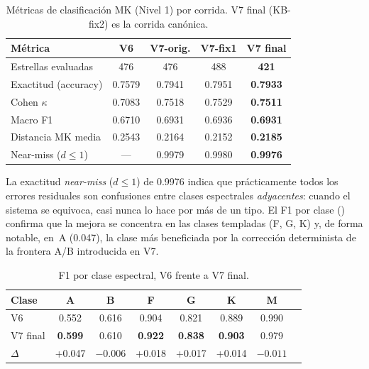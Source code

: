 \begin{table}[H]
  \centering
  \caption{Métricas de clasificación MK (Nivel 1) por corrida. V7 final
  (KB-fix2) es la corrida canónica.}
  \label{tab:l1-global}
  \begin{tabular}{lcccc}
    \toprule
    Métrica & V6 & V7-orig. & V7-fix1 & \textbf{V7 final} \\
    \midrule
    Estrellas evaluadas   & 476    & 476    & 488    & \textbf{421} \\
    Exactitud (accuracy)  & 0.7579 & 0.7941 & 0.7951 & \textbf{0.7933} \\
    Cohen $\kappa$        & 0.7083 & 0.7518 & 0.7529 & \textbf{0.7511} \\
    Macro F1              & 0.6710 & 0.6931 & 0.6936 & \textbf{0.6931} \\
    Distancia MK media    & 0.2543 & 0.2164 & 0.2152 & \textbf{0.2185} \\
    Near-miss ($d\le1$)   & ---    & 0.9979 & 0.9980 & \textbf{0.9976} \\
    \bottomrule
  \end{tabular}
\end{table}

La exactitud \emph{near-miss} ($d\le1$) de \num{0.9976} indica que prácticamente
todos los errores residuales son confusiones entre clases espectrales
\emph{adyacentes}: cuando el sistema se equivoca, casi nunca lo hace por más de un
tipo. El F1 por clase () confirma que la mejora se concentra
en las clases templadas (F, G, K) y, de forma notable, en~A (\num{+0.047}), la
clase más beneficiada por la corrección determinista de la frontera A/B
introducida en V7.

\begin{table}[H]
  \centering
  \caption{F1 por clase espectral, V6 frente a V7 final.}
  \label{tab:l1-perclass}
  \begin{tabular}{lccccccc}
    \toprule
    Clase & A & B & F & G & K & M \\
    \midrule
    V6        & 0.552 & 0.616 & 0.904 & 0.821 & 0.889 & 0.990 \\
    V7 final  & \textbf{0.599} & 0.610 & \textbf{0.922} & \textbf{0.838} & \textbf{0.903} & 0.979 \\
    $\Delta$  & +0.047 & $-0.006$ & +0.018 & +0.017 & +0.014 & $-0.011$ \\
    \bottomrule
  \end{tabular}
\end{table}

